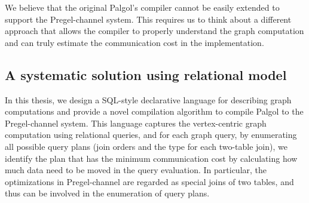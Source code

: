 \documentclass{sokendai_thesis} %
\begin{document}
We believe that the original Palgol's compiler cannot be easily extended to support the Pregel-channel system.
This requires us to think about a different approach that allows the compiler to properly understand the graph computation and can truly estimate the communication cost in the implementation.

\subsection{A systematic solution using relational model}

In this thesis, we design a SQL-style declarative language for describing graph computations and provide a novel compilation algorithm to compile Palgol to the Pregel-channel system.
This language captures the vertex-centric graph computation using relational queries, and for each graph query, by enumerating all possible query plans (join orders and the type for each two-table join), we identify the plan that has the minimum communication cost by calculating how much data need to be moved in the query evaluation.
In particular, the optimizations in Pregel-channel are regarded as special joins of two tables, and thus can be involved in the enumeration of query plans.
\end{document}
